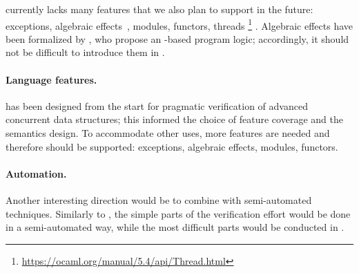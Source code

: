 \ZooLang currently lacks many features that we also plan to support in the future: exceptions, algebraic effects~\citep*{DBLP:conf/pldi/Sivaramakrishnan21}, modules, functors, threads%
\footnote{
\url{https://ocaml.org/manual/5.4/api/Thread.html}
}%
.
Algebraic effects have been formalized by \citet*{DBLP:journals/pacmpl/VilhenaP21}, who propose an \Iris-based program logic; accordingly, it should not be difficult to introduce them in \ZooLang.

\paragraph{Language features.}

\ZooLang has been designed from the start for pragmatic verification of advanced concurrent data structures; this informed the choice of feature coverage and the semantics design.
To accommodate other uses, more features are needed and therefore should be supported: exceptions, algebraic effects, modules, functors.

\paragraph{Automation.}

Another interesting direction would be to combine \Zoo with semi-automated techniques.
Similarly to \WhyThree, the simple parts of the verification effort would be done in a semi-automated way, while the most difficult parts would be conducted in \Rocq.

